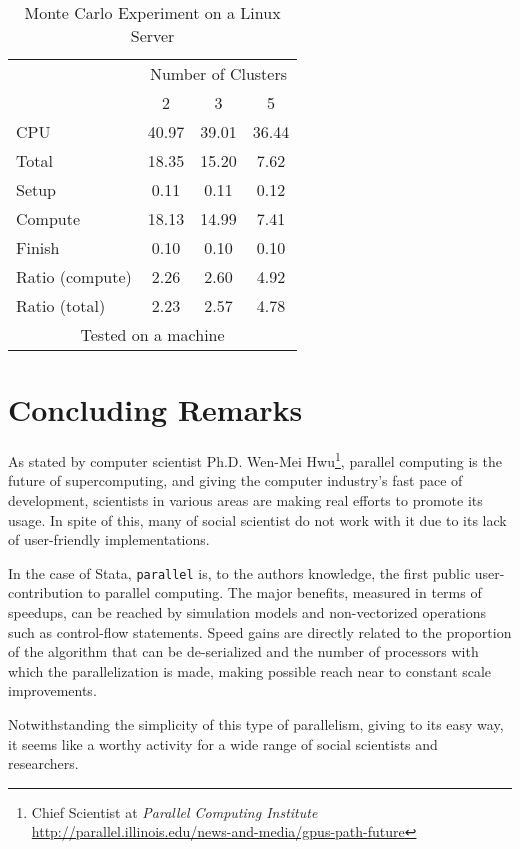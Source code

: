 \documentclass[letterpaper, 10pt]{article}
\begin{document}
\begin{table}[!h]
\centering
\caption{Monte Carlo Experiment on a Linux Server}
\begin{tabular}{l*{3}{c}}\hline
& \multicolumn{3}{c}{Number of Clusters} \\
& 2 &               3 &               5 \\ \hline
CPU &    40.97 &     39.01 &     36.44 \\
Total &    18.35 &     15.20 &      7.62 \\
\hspace{2mm} Setup &     0.11 &      0.11 &      0.12 \\
\hspace{2mm} Compute &    18.13 &     14.99 &      7.41 \\
\hspace{2mm} Finish &     0.10 &      0.10 &      0.10 \\
\hline Ratio (compute) &     2.26 &      2.60 &      4.92 \\
Ratio (total) &     2.23 &      2.57 &      4.78 \\
\hline
\multicolumn{4}{c}{\footnotesize Tested on a \unix1 machine}
\end{tabular}
\end{table}

\pagebreak

\section{Concluding Remarks}

As stated by computer scientist Ph.D. Wen-Mei Hwu\footnote{Chief Scientist at \emph{Parallel Computing Institute} \url{http://parallel.illinois.edu/news-and-media/gpus-path-future}}, parallel computing is the future of supercomputing, and giving the computer industry's fast pace of development, scientists in various areas are making real efforts to promote its usage. In spite of this, many of social scientist do not work with it due to its lack of user-friendly implementations.

In the case of Stata, {\tt parallel} is, to the authors knowledge, the first public user-contribution to parallel computing. The major benefits, measured in terms of speedups, can be reached by simulation models and non-vectorized operations such as control-flow statements. Speed gains are directly related to the proportion of the algorithm that can be de-serialized and the number of processors with which the parallelization is made, making possible reach near to constant scale improvements.

Notwithstanding the simplicity of this type of parallelism, giving to its easy way, it seems like a worthy activity for a wide range of social scientists and researchers.

\nocite{tierney2012,r}


\end{document}
